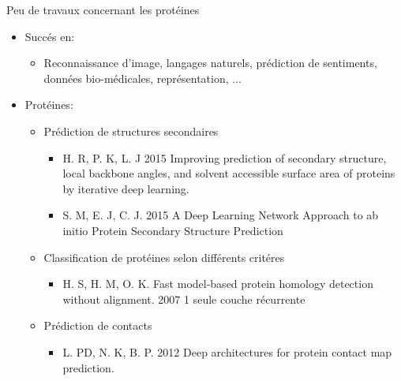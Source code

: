 \documentclass{beamer}
\begin{document}
\begin{frame}{Peu de travaux concernant les protéines}

      \begin{itemize}
      \item Succés en:\pause
        \begin{itemize}
        \item Reconnaissance d'image, langages naturels,
          prédiction de sentiments, données bio-médicales,
          représentation, ...\pause
        \end{itemize}
      \end{itemize}


      \begin{itemize}
      \item Protéines:
        \begin{itemize}
        \item Prédiction de structures secondaires\pause
          \begin{itemize}
          \item H. R, P. K, L. J 2015 Improving prediction of secondary
            structure, local backbone angles, and solvent accessible surface
            area of proteins by iterative deep learning. \pause
          \item S. M, E. J, C. J. 2015 A Deep Learning Network Approach to ab
            initio Protein Secondary Structure Prediction\pause
          \end{itemize}
        \item Classification de protéines selon différents critéres\pause
          \begin{itemize}
          \item H. S, H. M, O. K. Fast model-based protein homology detection
            without alignment. 2007 \alert{1 seule couche récurrente}\pause
          \end{itemize}
        \item Prédiction de contacts
          \begin{itemize}
          \item L. PD, N. K, B. P. 2012 Deep architectures for protein contact
            map prediction. \pause
          \end{itemize}
        \end{itemize}
      \end{itemize}


\end{frame}
\end{document}
